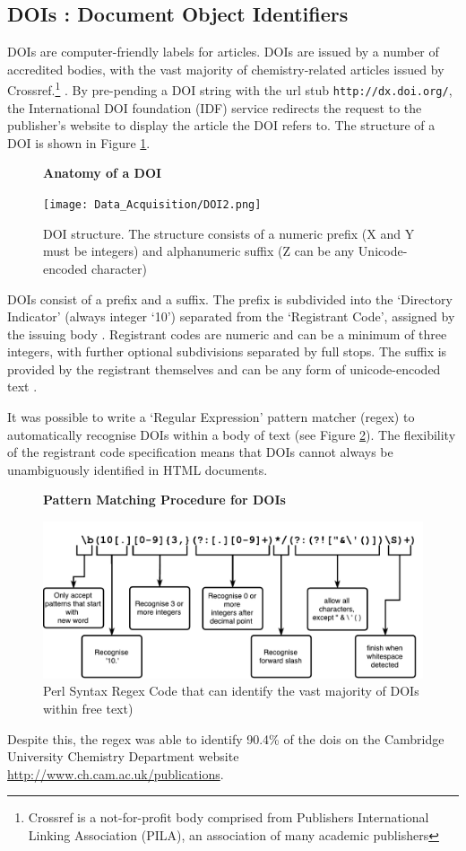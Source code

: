 \subsection{DOIs : Document Object Identifiers}
\label{sec:DOI}
DOIs are computer-friendly labels for articles. DOIs are issued by a number of accredited bodies, with the vast majority of chemistry-related articles issued by Crossref.\footnote{Crossref is a not-for-profit body comprised from Publishers International Linking Association (PILA), an association of many academic publishers} \cite{crossref-formation}. By pre-pending a DOI string with the url stub \texttt{http://dx.doi.org/}, the International DOI foundation (IDF) service redirects the request to the publisher's website to display the article the DOI refers to. The structure of a DOI is shown in Figure \ref{fig:DOI}.
\begin{figure}[H]
    \centering
    \textbf{Anatomy of a DOI}\par\medskip
    \texttt{[image: Data\_Acquisition/DOI2.png]}
    \caption[Anatomy of a DOI]{DOI structure. The structure consists of a numeric prefix (X and Y must be integers) and alphanumeric suffix (Z can be any Unicode-encoded character)} \label{fig:DOI}
\end{figure}
DOIs consist of a prefix and a suffix. The prefix is subdivided into the ‘Directory Indicator’ (always integer ‘10’) separated from the ‘Registrant Code’, assigned by the issuing body \cite{doi_handbook1}. Registrant codes are numeric and can be a minimum of three integers, with further optional subdivisions separated by full stops. The suffix is provided by the registrant themselves and can be any form of unicode-encoded text \cite{doi_handbook1}.


It was possible to write a `Regular Expression' pattern matcher (regex) to automatically recognise DOIs within a body of text (see Figure \ref{fig:REGEX}). The flexibility of the registrant code specification means that DOIs cannot always be unambiguously identified in HTML documents. 
\begin{figure}[H]
    \centering
    \textbf{Pattern Matching Procedure for DOIs}\par\medskip
    \includegraphics[width=\textwidth]{Data_Acquisition/Regex.pdf}
    \caption[Pattern Matching Procdure for DOIs]{Perl Syntax Regex Code that can identify the vast majority of DOIs within free text)} \label{fig:REGEX}
\end{figure}
Despite this, the regex was able to identify 90.4\% of the dois on the Cambridge University Chemistry Department website \url{http://www.ch.cam.ac.uk/publications}. 
